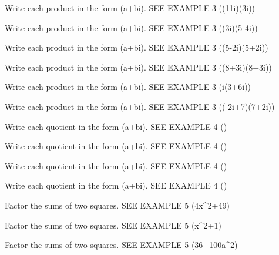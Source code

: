 \documentclass{article}
\newenvironment{practice}[2]{}{}        %
\newcommand{\answer}[1]{}               %
\begin{document}
\begin{practice}{24}{1}
Write each product in the form (a+bi). SEE EXAMPLE 3
((11i)(3i))
\answer{(-33)}
\end{practice}
\begin{practice}{25}{1}
Write each product in the form (a+bi). SEE EXAMPLE 3
((3i)(5-4i))
\answer{(12+15i)}
\end{practice}
\begin{practice}{26}{1}
Write each product in the form (a+bi). SEE EXAMPLE 3
((5-2i)(5+2i))
\answer{(29)}
\end{practice}
\begin{practice}{27}{1}
Write each product in the form (a+bi). SEE EXAMPLE 3
((8+3i)(8+3i))
\answer{(55+48i)}
\end{practice}
\begin{practice}{28}{1}
Write each product in the form (a+bi). SEE EXAMPLE 3
(i(3+6i))
\answer{(-2+i)}
\end{practice}
\begin{practice}{29}{1}
Write each product in the form (a+bi). SEE EXAMPLE 3
((-2i+7)(7+2i))
\answer{(53)}
\end{practice}
\begin{practice}{30}{1}
Write each quotient in the form (a+bi). SEE EXAMPLE 4
()
\answer{(6+6i)}
\end{practice}
\begin{practice}{31}{1}
Write each quotient in the form (a+bi). SEE EXAMPLE 4
()
\answer{(\frac{3}{4}-\frac{1}{4}i)}
\end{practice}
\begin{practice}{32}{1}
Write each quotient in the form (a+bi). SEE EXAMPLE 4
()
\answer{(4-2i)}
\end{practice}
\begin{practice}{33}{1}
Write each quotient in the form (a+bi). SEE EXAMPLE 4
()
\answer{(-\frac{4}{5}-\frac{8}{5}i)}
\end{practice}
\begin{practice}{34}{1}
Factor the sums of two squares. SEE EXAMPLE 5
(4x^2+49)
\answer{((2x+7i)(2x-7i))}
\end{practice}
\begin{practice}{35}{1}
Factor the sums of two squares. SEE EXAMPLE 5
(x^2+1)
\answer{((x+i)(x-i))}
\end{practice}
\begin{practice}{36}{1}
Factor the sums of two squares. SEE EXAMPLE 5
(36+100a^2)
\answer{(4(5a-3i)(5a+3i))}
\end{practice}
\end{document}
